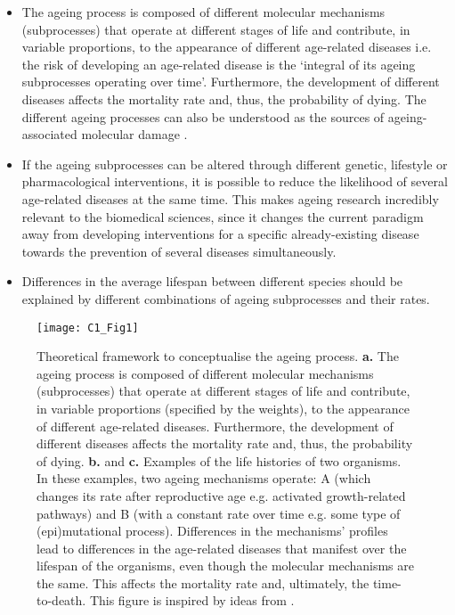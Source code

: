 \begin{itemize}
	
	\item The ageing process is composed of different molecular mechanisms (subprocesses) that operate at different stages of life and contribute, in variable proportions, to the appearance of different age-related diseases i.e. the risk of developing an age-related disease is the `integral of its ageing subprocesses operating over time'. Furthermore, the development of different diseases affects the mortality rate and, thus, the probability of dying. The different ageing processes can also be understood as the sources of ageing-associated molecular damage \citep{Lopez-Otin2013}.
	
	\item If the ageing subprocesses can be altered through different genetic, lifestyle or pharmacological interventions, it is possible to reduce the likelihood of several age-related diseases at the same time. This makes ageing research incredibly relevant to the biomedical sciences, since it changes the current paradigm away from developing interventions for a specific already-existing disease towards the prevention of several diseases simultaneously.
	
	\item  Differences in the average lifespan between different species should be explained by different combinations of ageing subprocesses and their rates.
		
\end{itemize}	

\begin{figure}[htbp!] 
	\centering    
	\texttt{[image: C1\_Fig1]}
	\vspace*{1 mm}
	\caption[Theoretical framework to conceptualise the ageing process]{Theoretical framework to conceptualise the ageing process. \textbf{a.} The ageing process is composed of different molecular mechanisms (subprocesses) that operate at different stages of life and contribute, in variable proportions (specified by the weights), to the appearance of different age-related diseases. Furthermore, the development of different diseases affects the mortality rate and, thus, the probability of dying. \textbf{b.} and \textbf{c.} Examples of the life histories of two organisms. In these examples, two ageing mechanisms operate: A (which changes its rate after reproductive age e.g. activated growth-related pathways) and B (with a constant rate over time e.g. some type of (epi)mutational process). Differences in the mechanisms' profiles lead to differences in the age-related diseases that manifest over the lifespan of the organisms, even though the molecular mechanisms are the same. This affects the mortality rate and, ultimately, the time-to-death. This figure is inspired by ideas from \citep{Hayflick2007,Gems2015,Peto1997,Stroustrup2016,Freund2019}.}
	\label{fig:c1_fig1}
\end{figure}

